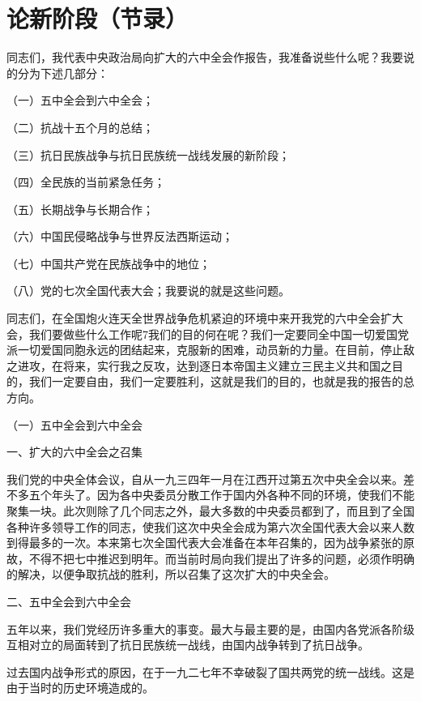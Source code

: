 \section[论新阶段（节录）（一九三八年十月）]{论新阶段（节录）}


同志们，我代表中央政治局向扩大的六中全会作报告，我准备说些什么呢？我要说的分为下述几部分：

（一）五中全会到六中全会；

（二）抗战十五个月的总结；

（三）抗日民族战争与抗日民族统一战线发展的新阶段；

（四）全民族的当前紧急任务；

（五）长期战争与长期合作；

（六）中国民侵略战争与世界反法西斯运动；

（七）中国共产党在民族战争中的地位；

（八）党的七次全国代表大会；我要说的就是这些问题。

同志们，在全国炮火连天全世界战争危机紧迫的环境中来开我党的六中全会扩大会，我们要做些什么工作呢7我们的目的何在呢？我们一定要同全中国一切爱国党派一切爱国同胞永远的团结起来，克服新的困难，动员新的力量。在目前，停止敌之进攻，在将来，实行我之反攻，达到逐日本帝国主义建立三民主义共和国之目的，我们一定要自由，我们一定要胜利，这就是我们的目的，也就是我的报告的总方向。

（一）五中全会到六中全会

一、扩大的六中全会之召集

我们党的中央全体会议，自从一九三四年一月在江西开过第五次中央全会以来。差不多五个年头了。因为各中央委员分散工作于国内外各种不同的环境，使我们不能聚集一块。此次则除了几个同志之外，最大多数的中央委员都到了，而且到了全国各种许多领导工作的同志，使我们这次中央全会成为第六次全国代表大会以来人数到得最多的一次。本来第七次全国代表大会准备在本年召集的，因为战争紧张的原故，不得不把七中推迟到明年。而当前时局向我们提出了许多的问题，必须作明确的解决，以便争取抗战的胜利，所以召集了这次扩大的中央全会。

二、五中全会到六中全会

五年以来，我们党经历许多重大的事变。最大与最主要的是，由国内各党派各阶级互相对立的局面转到了抗日民族统一战线，由国内战争转到了抗日战争。

过去国内战争形式的原因，在于一九二七年不幸破裂了国共两党的统一战线。这是由于当时的历史环境造成的。

